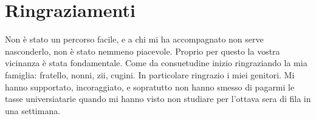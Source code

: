 \documentclass[11pt,a4paper]{article}
\begin{document}






















\clearpage

\appendix




\cleardoublepage



\section*{Ringraziamenti}
Non è stato un percorso facile, e a chi mi ha accompagnato non serve nasconderlo, non è stato nemmeno piacevole.
Proprio per questo la vostra vicinanza è stata fondamentale.
Come da consuetudine inizio ringraziando la mia famiglia: fratello, nonni, zii, cugini. In particolare ringrazio i miei genitori. Mi hanno supportato, incoraggiato, e sopratutto non hanno smesso di pagarmi le tasse universiatarie quando mi hanno visto non studiare per l'ottava sera di fila in una settimana.
\end{document}

